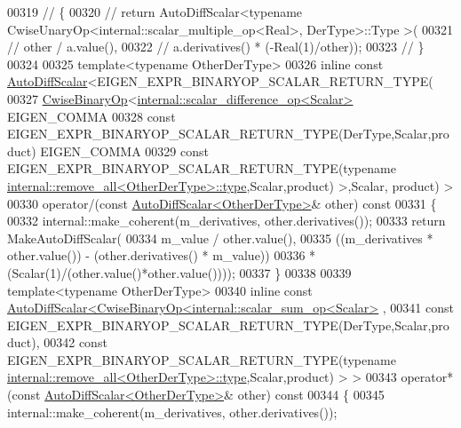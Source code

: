 \begin{DoxyCode}
00319 \textcolor{comment}{//     \{}
00320 \textcolor{comment}{//       return AutoDiffScalar<typename CwiseUnaryOp<internal::scalar\_multiple\_op<Real>, DerType>::Type >(}
00321 \textcolor{comment}{//         other / a.value(),}
00322 \textcolor{comment}{//         a.derivatives() * (-Real(1)/other));}
00323 \textcolor{comment}{//     \}}
00324 
00325     \textcolor{keyword}{template}<\textcolor{keyword}{typename} OtherDerType>
00326     \textcolor{keyword}{inline} \textcolor{keyword}{const} \hyperlink{class_eigen_1_1_auto_diff_scalar}{AutoDiffScalar}<EIGEN\_EXPR\_BINARYOP\_SCALAR\_RETURN\_TYPE(
00327         \hyperlink{group___core___module_class_eigen_1_1_cwise_binary_op}{CwiseBinaryOp}<\hyperlink{struct_eigen_1_1internal_1_1scalar__difference__op}{internal::scalar\_difference\_op<Scalar>}
       EIGEN\_COMMA
00328           \textcolor{keyword}{const} EIGEN\_EXPR\_BINARYOP\_SCALAR\_RETURN\_TYPE(DerType,Scalar,product) EIGEN\_COMMA
00329           \textcolor{keyword}{const} EIGEN\_EXPR\_BINARYOP\_SCALAR\_RETURN\_TYPE(\textcolor{keyword}{typename} 
      \hyperlink{group___sparse_core___module}{internal::remove\_all<OtherDerType>::type},Scalar,product) >,Scalar,
      product) >
00330     operator/(\textcolor{keyword}{const} \hyperlink{class_eigen_1_1_auto_diff_scalar}{AutoDiffScalar<OtherDerType>}& other)\textcolor{keyword}{ const}
00331 \textcolor{keyword}{    }\{
00332       internal::make\_coherent(m\_derivatives, other.derivatives());
00333       \textcolor{keywordflow}{return} MakeAutoDiffScalar(
00334         m\_value / other.value(),
00335           ((m\_derivatives * other.value()) - (other.derivatives() * m\_value))
00336         * (Scalar(1)/(other.value()*other.value())));
00337     \}
00338 
00339     \textcolor{keyword}{template}<\textcolor{keyword}{typename} OtherDerType>
00340     \textcolor{keyword}{inline} \textcolor{keyword}{const} \hyperlink{class_eigen_1_1_auto_diff_scalar}{AutoDiffScalar<CwiseBinaryOp<internal::scalar\_sum\_op<Scalar>}
      ,
00341         \textcolor{keyword}{const} EIGEN\_EXPR\_BINARYOP\_SCALAR\_RETURN\_TYPE(DerType,Scalar,product),
00342         \textcolor{keyword}{const} EIGEN\_EXPR\_BINARYOP\_SCALAR\_RETURN\_TYPE(\textcolor{keyword}{typename} 
      \hyperlink{group___sparse_core___module}{internal::remove\_all<OtherDerType>::type},Scalar,product) > >
00343     operator*(\textcolor{keyword}{const} \hyperlink{class_eigen_1_1_auto_diff_scalar}{AutoDiffScalar<OtherDerType>}& other)\textcolor{keyword}{ const}
00344 \textcolor{keyword}{    }\{
00345       internal::make\_coherent(m\_derivatives, other.derivatives());

\end{DoxyCode}
